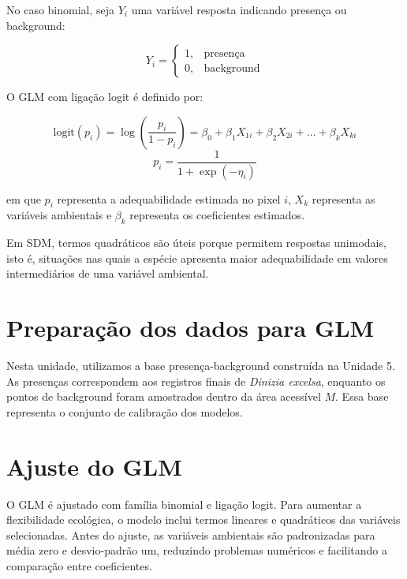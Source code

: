 \documentclass{ueap-sdm}
\begin{document}
No caso binomial, seja \(Y_i\) uma variável resposta indicando presença ou background:

\[
Y_i =
\begin{cases}
	1, & \text{presença}\\
	0, & \text{background}
\end{cases}
\]

O GLM com ligação logit é definido por:

\begin{equationbox}
	\[
	\text{logit}(p_i)=
	\log\left(\frac{p_i}{1-p_i}\right)
	=
	\beta_0+\beta_1X_{1i}+\beta_2X_{2i}+...+\beta_kX_{ki}
	\]
	\[
	p_i=
	\frac{1}{1+\exp(-\eta_i)}
	\]
\end{equationbox}

em que \(p_i\) representa a adequabilidade estimada no pixel \(i\), \(X_k\) representa as variáveis ambientais e \(\beta_k\) representa os coeficientes estimados.

\begin{dica}[title={\faLightbulb\quad Termos quadráticos}]
	Em SDM, termos quadráticos são úteis porque permitem respostas unimodais, isto é, situações nas quais a espécie apresenta maior adequabilidade em valores intermediários de uma variável ambiental.
\end{dica}

\section{Preparação dos dados para GLM}

Nesta unidade, utilizamos a base presença-background construída na Unidade 5. As presenças correspondem aos registros finais de \textit{Dinizia excelsa}, enquanto os pontos de background foram amostrados dentro da área acessível \(M\). Essa base representa o conjunto de calibração dos modelos.



\section{Ajuste do GLM}

O GLM é ajustado com família binomial e ligação logit. Para aumentar a flexibilidade ecológica, o modelo inclui termos lineares e quadráticos das variáveis selecionadas. Antes do ajuste, as variáveis ambientais são padronizadas para média zero e desvio-padrão um, reduzindo problemas numéricos e facilitando a comparação entre coeficientes.
\end{document}
